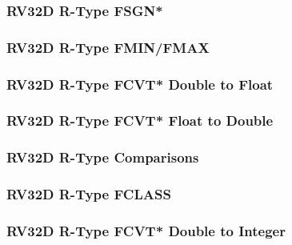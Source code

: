 \subsubsection[{\small RV32D R-Type FSGN*}]{RV32D R-Type FSGN*} \label{sec:format-RV32D-RTypeFSGN}



\subsubsection[{\small RV32D R-Type FMIN/FMAX}]{RV32D R-Type FMIN/FMAX} \label{sec:format-RV32D-RTypeFMIN}



\subsubsection[{\small RV32D R-Type FCVT* Double to Float}]{RV32D R-Type FCVT* Double to Float} \label{sec:format-RV32D-RTypeFCD2F}



\subsubsection[{\small RV32D R-Type FCVT* Float to Double}]{RV32D R-Type FCVT* Float to Double} \label{sec:format-RV32D-RTypeFCF2D}



\subsubsection[{\small RV32D R-Type Comparisons}]{RV32D R-Type Comparisons} \label{sec:format-RV32D-RTypeFCMP}



\subsubsection[{\small RV32D R-Type FCLASS}]{RV32D R-Type FCLASS} \label{sec:format-RV32D-RTypeFD2I}



\subsubsection[{\small RV32D R-Type FCVT* Double to Integer}]{RV32D R-Type FCVT* Double to Integer} \label{sec:format-RV32D-RTypeFCD2I}

